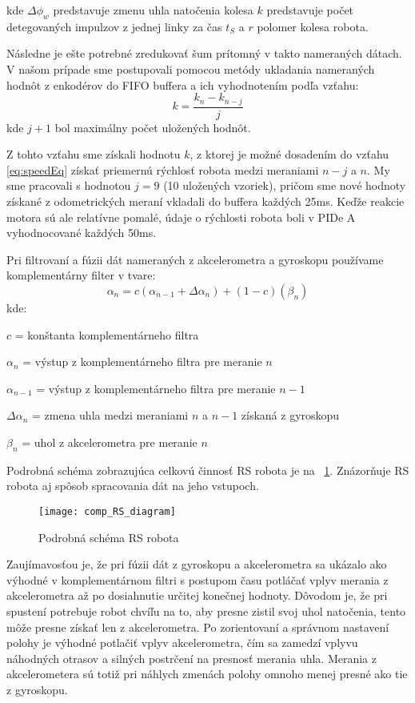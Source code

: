 kde $\Delta\phi_w$ predstavuje zmenu uhla natočenia kolesa $k$ predstavuje počet detegovaných impulzov z jednej linky za čas $t_S$ a $r$ polomer kolesa robota.

Následne je ešte potrebné zredukovať šum prítomný v takto nameraných dátach. V našom prípade sme postupovali pomocou metódy ukladania nameraných hodnôt z enkodérov do FIFO buffera a ich vyhodnotením podľa vzťahu: 
\begin{equation}
k = \dfrac {k_n - k_{n-j}}{j}
\end{equation}
kde $j+1$ bol maximálny počet uložených hodnôt.

Z tohto vzťahu sme získali hodnotu $k$, z ktorej je možné dosadením do vzťahu \ref{eq:speedEq} získať priemernú rýchlosť robota medzi meraniami $n-j$ a $n$. My sme pracovali s hodnotou $j=9$ (10 uložených vzoriek), pričom sme nové hodnoty získané z odometrických meraní vkladali do buffera každých 25ms. Keďže reakcie motora sú ale relatívne pomalé, údaje o rýchlosti robota boli v PIDe A vyhodnocované každých 50ms.  

Pri filtrovaní a fúzii dát nameraných z akcelerometra a gyroskopu používame komplementárny filter v tvare:
\begin{equation}
\alpha_n = c(\alpha_{n-1}+\Delta\alpha_{n}) + (1-c)(\beta_n)
\end{equation}
kde:

$c$ = konštanta komplementárneho filtra

$\alpha_n$ = výstup z komplementárneho filtra pre meranie $n$

$\alpha_{n-1}$ = výstup z komplementárneho filtra pre meranie $n-1$

$\Delta\alpha_{n}$ = zmena uhla medzi meraniami $n$ a $n-1$ získaná z gyroskopu 

$\beta_n$ = uhol z akcelerometra pre meranie $n$


Podrobná schéma zobrazujúca celkovú činnosť \ac{RS} robota je na \figurename~\ref{fig:podrobna_schema}. Znázorňuje RS robota aj spôsob spracovania dát na jeho vstupoch.
\begin{figure}[!b]
\centering
\texttt{[image: comp\_RS\_diagram]}
\caption{Podrobná schéma RS robota}
\label{fig:podrobna_schema}
\end{figure}

Zaujímavosťou je, že pri fúzii dát z gyroskopu a akcelerometra sa ukázalo ako výhodné v komplementárnom filtri s postupom času potláčať vplyv merania z akcelerometra až po dosiahnutie určitej konečnej hodnoty. Dôvodom je, že pri spustení potrebuje robot chvíľu na to, aby presne zistil svoj uhol natočenia, tento môže presne získať len z akcelerometra. Po zorientovaní a správnom nastavení polohy je výhodné potlačiť vplyv akcelerometra, čím sa zamedzí vplyvu náhodných otrasov a silných postrčení na presnosť merania uhla. Merania z akcelerometera sú totiž pri náhlych zmenách polohy omnoho menej presné ako tie z gyroskopu.


